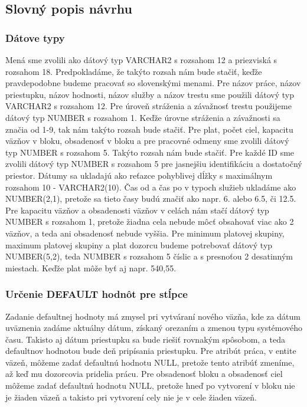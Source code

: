\documentclass[slovak, 12pt, Times New Roman]{article}
\begin{document}
		\subsection{Slovný popis návrhu}
			\subsubsection{Dátove typy}
				Mená sme zvolili ako dátový typ VARCHAR2 s rozsahom 12 a priezviská s rozsahom 18. Predpokladáme, že takýto rozsah nám bude stačiť, keďže pravdepodobne budeme pracovať so slovenskými menami.
				Pre názov práce, názov priestupku, názov hodnosti, názov služby a názov trestu sme použili dátový typ VARCHAR2 s rozsahom 12. 
				Pre úroveň stráženia a závažnosť trestu použijeme dátový typ NUMBER s rozsahom 1. Keďže úrovne stráženia a závažnosti sa značia od 1-9, tak nám takýto rozsah bude stačiť. 
				Pre plat, počet ciel, kapacitu väzňov v bloku, obsadenosť v bloku a pre pracovné odmeny sme zvolili dátový typ NUMBER s rozsahom 5. Takýto rozsah nám bude stačiť. 
				Pre každé ID sme zvolili dátový typ NUMBER s rozsahom 5 pre jasnejšiu identifikáciu a dostatočný priestor. 
				Dátumy sa ukladajú ako reťazce pohyblivej dĺžky s maximálnym rozsahom 10 - VARCHAR2(10).
				Čas od a čas po v typoch služieb ukladáme ako NUMBER(2,1), pretože sa tieto časy budú značiť ako napr. 6. alebo 6.5, či 12.5.
				Pre kapacitu väzňov a obsadenosti väzňov v celách nám stačí dátový typ NUMBER s rozsahom 1, pretože žiadna cela nebude môcť obsahovať viac ako 2 väzňov, a teda ani obsadenosť nebude vyššia. 
				Pre minimum platovej skupiny, maximum platovej skupiny a plat dozorcu budeme potrebovať dátový typ NUMBER(5,2), teda NUMBER s rozsahom 5 číslic a s presnoťou 2 desatinným miestach. Keďže plat môže byť aj napr. 540,55.
			\subsubsection{Určenie DEFAULT hodnôt pre stĺpce}
				Zadanie defaultnej hodnoty má zmysel pri vytváraní nového väzňa, kde za dátum uväznenia zadáme aktuálny dátum, získaný orezaním a zmenou typu systémového času. 
				Takisto aj dátum priestupku sa bude riešiť rovnakým spôsobom, a teda defaultnov hodnotou bude deň pripísania priestupku.
				Pre atribút práca, v entite väzeň, môžeme zadať defaultnú hodnotu NULL, pretože tento atribúť zmeníme, až keď mu dozorcovia pridelia prácu. 
				Pre obsadenosť bloku a obsadenosť ciel môžeme zadať defaultnú hodnotu NULL, pretože hneď po vytvorení v bloku nie je žiaden väzeň a takisto pri vytvorení cely nie je v cele žiaden väzeň. 
\end{document}
